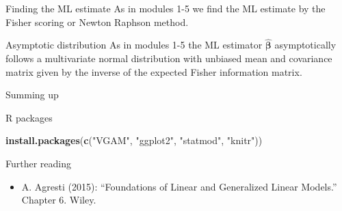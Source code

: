 \documentclass[
  ignorenonframetext,
]{beamer}
\newenvironment{Shaded}{\begin{snugshade}}{\end{snugshade}}
\newcommand{\FunctionTok}[1]{\textcolor[rgb]{0.13,0.29,0.53}{\textbf{#1}}}
\newcommand{\NormalTok}[1]{#1}
\newcommand{\StringTok}[1]{\textcolor[rgb]{0.31,0.60,0.02}{#1}}
\providecommand{\tightlist}{%
  \setlength{\itemsep}{0pt}\setlength{\parskip}{0pt}}
\begin{document}
\begin{frame}
\begin{block}{Finding the ML estimate}
\label{finding-the-ml-estimate}
As in modules 1-5 we find the ML estimate by the Fisher scoring or
Newton Raphson method.
\end{block}

\begin{block}{Asymptotic distribution}
\label{asymptotic-distribution}
As in modules 1-5 the ML estimator \(\hat{\boldsymbol \beta}\)
asymptotically follows a multivariate normal distribution with unbiased
mean and covariance matrix given by the inverse of the expected Fisher
information matrix.
\end{block}
\end{frame}

\begin{frame}{Summing up}
\label{summing-up}
\end{frame}

\begin{frame}[fragile]{R packages}
\label{r-packages}
\begin{Shaded}
\begin{Highlighting}[]
\FunctionTok{install.packages}\NormalTok{(}\FunctionTok{c}\NormalTok{(}\StringTok{"VGAM"}\NormalTok{, }\StringTok{"ggplot2"}\NormalTok{, }\StringTok{"statmod"}\NormalTok{, }\StringTok{"knitr"}\NormalTok{))}
\end{Highlighting}
\end{Shaded}
\end{frame}

\begin{frame}{Further reading}
\label{further-reading}
\begin{itemize}
\tightlist
\item
  A. Agresti (2015): ``Foundations of Linear and Generalized Linear
  Models.'' Chapter 6. Wiley.
\end{itemize}
\end{frame}
\end{document}
